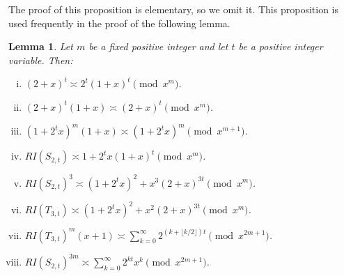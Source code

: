\documentclass[reqno]{amsart}
\newtheorem{lemma}{Lemma}
\newcommand{\floor}[1]{\lfloor #1\rfloor}
\begin{document}
The proof of this proposition is elementary, so we omit it. This proposition is used frequently in the proof of the following lemma.


\begin{lemma}\label{l:comp}
Let $m$ be a fixed positive integer and let $t$ be a positive integer variable. Then:
\begin{enumerate}[(i)]
\item\label{l:i} $(2+x)^t\asymp2^t(1+x)^t\pmod{x^m}$.
\item\label{l:i1} $(2+x)^t(1+x)\asymp (2+x)^t\pmod{x^m}$.
  \item \label{l:i2} $(1+2^tx)^m(1+x)\asymp (1+2^tx)^m\pmod{x^{m+1}}$.
  \item\label{l:ii} $RI(S_{2,t})\asymp 1+2^tx(1+x)^t\pmod{x^m}$.
    \item\label{l:ii1} $RI(S_{2,t})^3\asymp (1+2^tx)^{2}+x^3(2+x)^{3t} \pmod{x^m}$.
\item\label{l:iv} $RI(T_{3,t})\asymp (1+2^tx)^{2}+x^{2}(2+x)^{3t}\pmod{x^m}$.
\item\label{l:v} $RI(T_{3,t})^{m}(x+1)\asymp \sum_{k=0}^{\infty} 2^{(k+\floor{k/2})t}\pmod{x^{2m+1}}$.
\item\label{l:vi} $RI(S_{2,t})^{3m}\asymp \sum_{k=0}^{\infty}2^{kt}x^k\pmod{x^{2m+1}}$.
\end{enumerate}
\end{lemma}
\end{document}
